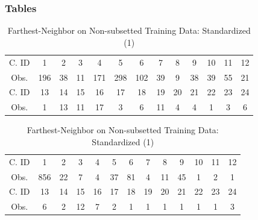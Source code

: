 \documentclass{beamer}
\begin{document}
\begin{frame}

	\frametitle{Tables}
\begin{table}[H]
\center
\begin{tabular}{c c c c c c c c c c c c c}
\hline
C. ID           & 1 & 2 & 3 & 4 & 5 & 6 & 7 & 8 & 9 & 10 & 11 & 12  \\
Obs. 		 &196 & 38 & 11 & 171 & 298 & 102 & 39 & 9 & 38 & 39 & 55 & 21  \\
\hline
C. ID           & 13 & 14 & 15 & 16 & 17 & 18 & 19 & 20 & 21 & 22 & 23 & 24  \\
Obs.         	& 1 & 13 & 11 & 17 & 3 & 6 & 11 & 4 & 4 & 1 & 3 & 6  \\
\hline
\end{tabular}
\caption{Farthest-Neighbor on Non-subsetted Training Data: Normalized (3)}
\begin{tabular}{c c c c c c c c c c c c c}
\hline
C. ID           & 1 & 2 & 3 & 4 & 5 & 6 & 7 & 8 & 9 & 10 & 11 & 12  \\
Obs. 		 & 856 & 22 & 7 & 4 & 37 & 81 & 4 & 11 & 45 & 1 & 2 & 1  \\
\hline
C. ID           & 13 & 14 & 15 & 16 & 17 & 18 & 19 & 20 & 21 & 22 & 23 & 24  \\
Obs.         	 & 6 & 2 & 12 & 7 & 2 & 1 & 1 & 1 & 1 & 1 & 1 & 3  \\
\hline
\end{tabular}
\caption{Farthest-Neighbor on Non-subsetted Training Data: Standardized (1)}
\end{table}
\end{frame}

	
\end{document}
